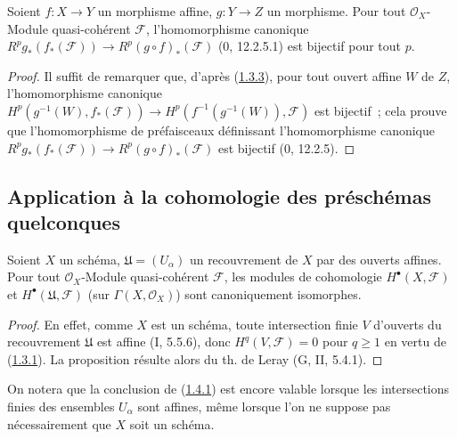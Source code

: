\begin{corollary}[1.3.4]
\label{III.1.3.4-fr}
Soient $f:X\to Y$ un morphisme affine, $g:Y\to Z$ un morphisme.
Pour tout $\mathcal O_X$-Module quasi-cohérent $\mathcal F$,
l'homomorphisme canonique
$R^pg_*(f_*(\mathcal F))\to R^p(g\circ f)_*(\mathcal F)$ (0, 12.2.5.1)
est bijectif pour tout $p$.
\end{corollary}

\begin{proof}
Il suffit de remarquer que, d'après
(\hyperref[III.1.3.3-fr]{1.3.3}), pour tout ouvert affine $W$ de $Z$,
l'homomorphisme canonique
$H^p(g^{-1}(W),f_*(\mathcal F))\to
H^p(f^{-1}(g^{-1}(W)),\mathcal F)$ est bijectif~; cela prouve que
l'homomorphisme de préfaisceaux définissant l'homomorphisme canonique
$R^pg_*(f_*(\mathcal F))\to R^p(g\circ f)_*(\mathcal F)$ est bijectif
(0, 12.2.5).
\end{proof}

\subsection{Application à la cohomologie des préschémas quelconques}
\label{subsection:III.1.4-fr}

\begin{proposition}[1.4.1]
\label{III.1.4.1-fr}
Soient $X$ un schéma, $\mathfrak U=(U_\alpha)$ un recouvrement de $X$ par
des ouverts affines. Pour tout $\mathcal O_X$-Module quasi-cohérent
$\mathcal F$, les modules de cohomologie $H^\bullet(X,\mathcal F)$ et
$H^\bullet(\mathfrak U,\mathcal F)$ (sur $\Gamma(X,\mathcal O_X)$) sont
canoniquement isomorphes.
\end{proposition}

\begin{proof}
En effet, comme $X$ est un schéma, toute intersection finie $V$ d'ouverts du
recouvrement $\mathfrak U$ est affine (I, 5.5.6), donc
$H^q(V,\mathcal F)=0$ pour $q\geq1$ en vertu de
(\hyperref[III.1.3.1-fr]{1.3.1}). La proposition résulte alors du th. de
Leray (G, II, 5.4.1).
\end{proof}

\begin{remark}[1.4.2]
\label{III.1.4.2-fr}
On notera que la conclusion de (\hyperref[III.1.4.1-fr]{1.4.1}) est encore
valable lorsque les intersections finies des ensembles $U_\alpha$ sont
affines, même lorsque l'on ne suppose pas nécessairement que $X$ soit un
schéma.
\end{remark}

